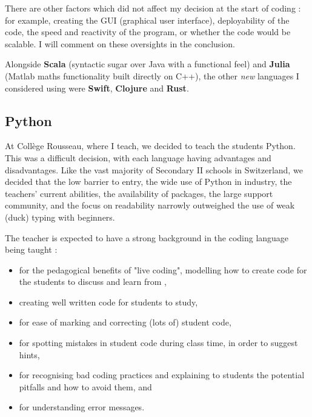 \documentclass[10pt]{article}
\begin{document}
There are other factors which did not affect my decision at the start of coding : for example, creating the GUI (graphical user interface), deployability of the code, the speed and reactivity of the program, or whether the code would be scalable. I will comment on these oversights in the conclusion.

Alongside \textbf{Scala} (syntactic sugar over Java with a functional feel) and \textbf{Julia} (Matlab maths functionality built directly on C++), the other \emph{new} languages I considered using were \textbf{Swift}, \textbf{Clojure} and \textbf{Rust}.

\subsection{Python} \label{python}
At Collège Rousseau, where I teach, we decided to teach the students Python. This was a difficult decision, with each language having advantages and disadvantages. Like the vast majority of Secondary II schools in Switzerland, we decided that the low barrier to entry, the wide use of Python in industry, the teachers' current abilities, the availability of packages, the large support community, and the focus on readability narrowly outweighed the use of weak (duck) typing with beginners.

The teacher is expected to have a strong background in the coding language being taught :
\begin{itemize}
\item for the pedagogical benefits of "live coding", modelling how to create code for the students to discuss and learn from \cite{Raj2018}, 
\item creating well written code for students to study,
\item for ease of marking and correcting (lots of) student code,
\item for spotting mistakes in student code during class time, in order to suggest hints,
\item for recognising bad coding practices and explaining to students the potential pitfalls and how to avoid them, and
\item for understanding error messages.
\end{itemize}
\end{document}
